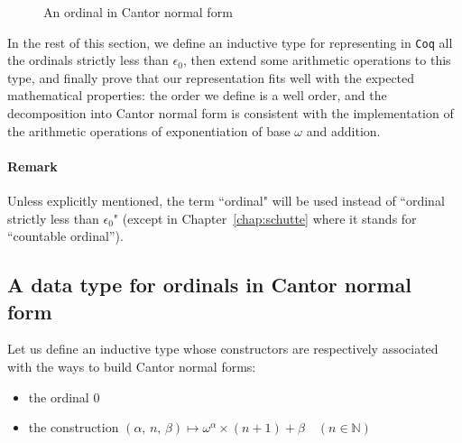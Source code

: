 \begin{figure}[htb]
\centering
{}
\caption{\label{fig:cnf-example}
An ordinal in Cantor normal form}
\end{figure}




In the rest of this section, we define an inductive type for representing in \texttt{Coq}
all the ordinals strictly  less than  \(\epsilon_0\), then extend some arithmetic operations
to this type, and finally prove that our representation fits well with 
the expected mathematical properties: the order we define is a well order, 
and the decomposition into Cantor normal form  is consistent 
with the implementation of the arithmetic operations of exponentiation of base \(\omega\) 
and addition.

\paragraph*{Remark}
\label{sec:orgheadline65}
Unless explicitly mentioned, the term ``ordinal" will be used instead of
``ordinal strictly less than \(\epsilon_0\)" (except in Chapter~\ref{chap:schutte} where it stands for ``countable ordinal'').



\subsection{A data type for  ordinals in Cantor normal form}
\label{sec:orgheadline72}
\label{sec:T1-inductive-def}





    Let us define an inductive type whose 
constructors are respectively associated
with the ways to build Cantor normal forms:

\begin{itemize}
\item the ordinal \(0\)
\item the construction \((\alpha,\, n,\,\beta)  \mapsto \omega^\alpha \times (n + 1)+ \beta \quad (n\in\mathbb{N})\)
\end{itemize}


